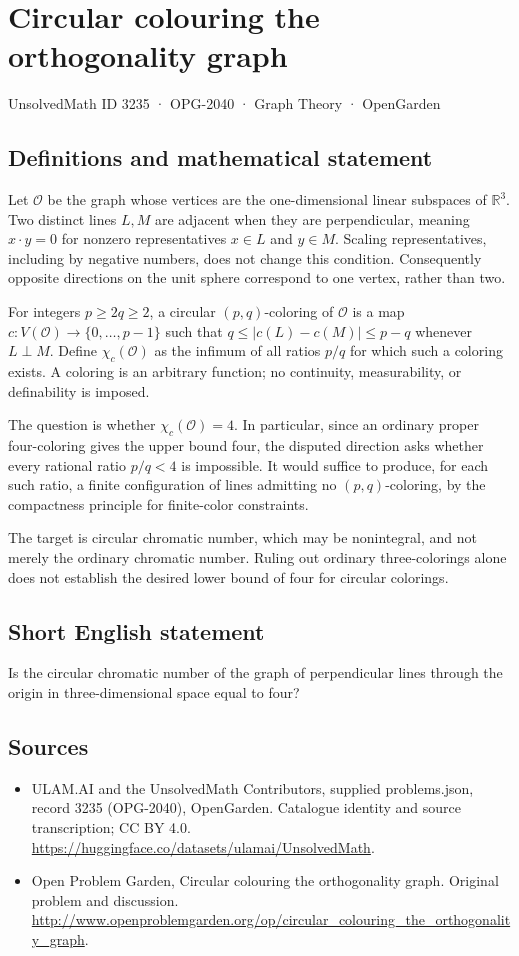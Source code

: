 \documentclass[11pt,a4paper]{article}
\begin{document}
\section*{Circular colouring the orthogonality graph}\label{3235}
{\small UnsolvedMath ID 3235 · OPG-2040 · Graph Theory · OpenGarden}
\subsection{Definitions and mathematical statement}
Let $\mathcal O$ be the graph whose vertices are the one-dimensional linear subspaces of $\mathbb R^3$. Two distinct lines $L,M$ are adjacent when they are perpendicular, meaning $x\cdot y=0$ for nonzero representatives $x\in L$ and $y\in M$. Scaling representatives, including by negative numbers, does not change this condition. Consequently opposite directions on the unit sphere correspond to one vertex, rather than two.

For integers $p\ge2q\ge2$, a circular $(p,q)$-coloring of $\mathcal O$ is a map $c:V(\mathcal O)\to\{0,\ldots,p-1\}$ such that $q\le|c(L)-c(M)|\le p-q$ whenever $L\perp M$. Define $\chi_c(\mathcal O)$ as the infimum of all ratios $p/q$ for which such a coloring exists. A coloring is an arbitrary function; no continuity, measurability, or definability is imposed.

The question is whether $\chi_c(\mathcal O)=4$. In particular, since an ordinary proper four-coloring gives the upper bound four, the disputed direction asks whether every rational ratio $p/q<4$ is impossible. It would suffice to produce, for each such ratio, a finite configuration of lines admitting no $(p,q)$-coloring, by the compactness principle for finite-color constraints.

The target is circular chromatic number, which may be nonintegral, and not merely the ordinary chromatic number. Ruling out ordinary three-colorings alone does not establish the desired lower bound of four for circular colorings.
\subsection{Short English statement}
Is the circular chromatic number of the graph of perpendicular lines through the origin in three-dimensional space equal to four?
\subsection{Sources}
\begin{itemize}
\item[S1] ULAM.AI and the UnsolvedMath Contributors, supplied problems.json, record 3235 (OPG-2040), OpenGarden. Catalogue identity and source transcription; CC BY 4.0.
\url{https://huggingface.co/datasets/ulamai/UnsolvedMath}.
\item[S2] Open Problem Garden, Circular colouring the orthogonality graph. Original problem and discussion.
\url{http://www.openproblemgarden.org/op/circular_colouring_the_orthogonality_graph}.
\end{itemize}
\end{document}
